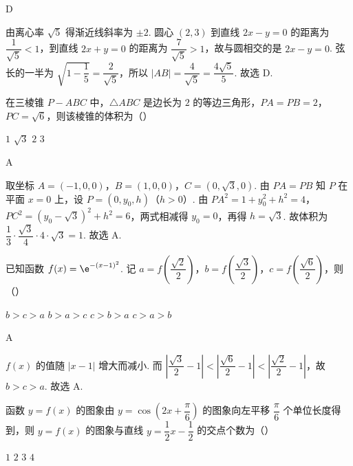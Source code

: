 \begin{answer}
D
\end{answer}

\begin{solution}
由离心率 \(\sqrt5\) 得渐近线斜率为 \(\pm2\). 圆心 \((2,3)\) 到直线 \(2x-y=0\) 的距离为 \(\dfrac1{\sqrt5}<1\)，到直线 \(2x+y=0\) 的距离为 \(\dfrac7{\sqrt5}>1\)，故与圆相交的是 \(2x-y=0\). 弦长的一半为 \(\sqrt{1-\dfrac15}=\dfrac{2}{\sqrt5}\)，所以 \(|AB|=\dfrac{4}{\sqrt5}=\dfrac{4\sqrt5}{5}\). 故选 D.
\end{solution}

\begin{problem}
在三棱锥 \(P-ABC\) 中，\(\triangle ABC\) 是边长为 \(2\) 的等边三角形，\(PA=PB=2\)，\(PC=\sqrt{6}\)，则该棱锥的体积为（\quad）

\choices
    {\(1\)}
    {\(\sqrt{3}\)}
    {\(2\)}
    {\(3\)}
\end{problem}

\begin{answer}
A
\end{answer}

\begin{solution}
取坐标 \(A=(-1,0,0)\)，\(B=(1,0,0)\)，\(C=(0,\sqrt3,0)\). 由 \(PA=PB\) 知 \(P\) 在平面 \(x=0\) 上，设 \(P=(0,y_0,h)\)（\(h>0\)）. 由 \(PA^2=1+y_0^2+h^2=4\)，\(PC^2=(y_0-\sqrt3)^2+h^2=6\)，两式相减得 \(y_0=0\)，再得 \(h=\sqrt3\). 故体积为 \(\dfrac13\cdot\dfrac{\sqrt3}{4}\cdot4\cdot\sqrt3=1\). 故选 A.
\end{solution}

\begin{problem}
已知函数 \(f(x)=\e^{-\left(x-1\right)^2}\). 记 \(a=f\left(\dfrac{\sqrt{2}}{2}\right)\)，\(b=f\left(\dfrac{\sqrt{3}}{2}\right)\)，\(c=f\left(\dfrac{\sqrt{6}}{2}\right)\)，则（\quad）

\choices
    {\(b>c>a\)}
    {\(b>a>c\)}
    {\(c>b>a\)}
    {\(c>a>b\)}
\end{problem}

\begin{answer}
A
\end{answer}

\begin{solution}
\(f(x)\) 的值随 \(|x-1|\) 增大而减小. 而 \(\left|\dfrac{\sqrt3}{2}-1\right|<\left|\dfrac{\sqrt6}{2}-1\right|<\left|\dfrac{\sqrt2}{2}-1\right|\)，故 \(b>c>a\). 故选 A.
\end{solution}

\begin{problem}
函数 \(y=f(x)\) 的图象由 \(y=\cos\left(2x+\dfrac{\pi}{6}\right)\) 的图象向左平移 \(\dfrac{\pi}{6}\) 个单位长度得到，则 \(y=f(x)\) 的图象与直线 \(y=\dfrac{1}{2}x-\dfrac{1}{2}\) 的交点个数为（\quad）

\choices
    {\(1\)}
    {\(2\)}
    {\(3\)}
    {\(4\)}
\end{problem}

